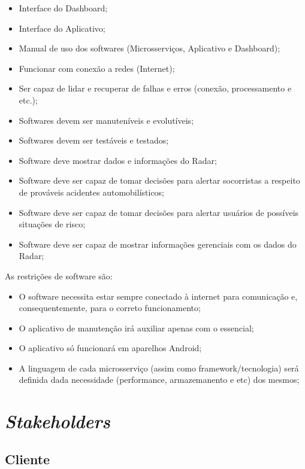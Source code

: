 \begin{itemize}
    \item Interface do Dashboard;
    \item Interface do Aplicativo;
    \item Manual de uso dos softwares (Microsserviços, Aplicativo e Dashboard);
    \item Funcionar com conexão a redes (Internet);
    \item Ser capaz de lidar e recuperar de falhas e erros (conexão, processamento e etc.);
    \item Softwares devem ser manuteníveis e evolutíveis;
    \item Softwares devem ser testáveis e testados;
    \item Software deve mostrar dados e informações do Radar;
    \item Software deve ser capaz de tomar decisões para alertar socorristas a respeito de prováveis acidentes automobilísticos;
    \item Software deve ser capaz de tomar decisões para alertar usuários de possíveis situações de risco;
    \item Software deve ser capaz de mostrar informações gerenciais com os dados do Radar;
\end{itemize}

As restrições de software são:

\begin{itemize}
    \item O software necessita estar sempre conectado à internet para comunicação e, consequentemente, para o correto funcionamento;
    \item O aplicativo de manutenção irá auxiliar apenas com o essencial;
    \item O aplicativo só funcionará em aparelhos Android;
    \item A linguagem de cada microsserviço (assim como framework/tecnologia) será definida dada necessidade (performance, armazemanento e etc) dos mesmos;
\end{itemize}

\section{\emph{Stakeholders}}

\subsection {Cliente}

